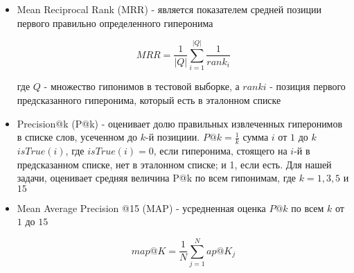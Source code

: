 \begin{itemize}

\item Mean Reciprocal Rank (MRR) - является показателем средней позиции первого правильно определенного гиперонима

$$MRR= \frac{1}{|Q|} \sum^{|Q|}_{i=1} \frac{1}{rank_i}$$

где $Q$ - множество гипонимов в тестовой выборке, а
$rank i$ - позиция первого предсказанного гиперонима, который
есть в эталонном списке

\item Precision@k (P@k) - оценивает долю правильных извлеченных гиперонимов в списке
слов, усеченном до $k$-й позициии.
$P@k = \frac{1}{k}$ сумма $i$ от $1$ до $k$ $isTrue(i)$, где $isTrue(i) = 0$, если гиперонима, стоящего на $i$-й в
предсказанном списке, нет в эталонном списке; и 1, если есть.
Для нашей задачи, оценивает средняя величина P@k по всем гипонимам, где $k = 1, 3, 5$ и
$15$

\item Mean Average Precision @15 (MAP) - усредненная оценка $P@k$ по всем $k$ от $1$ до $15$

$$map@K = \frac{1}{N} \sum^N_{j=1} ap@K_j$$

\end{itemize}
